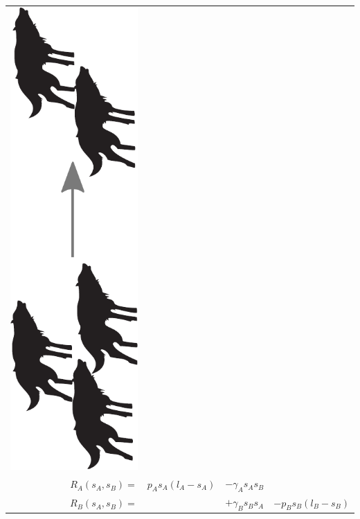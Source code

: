 \documentclass[12pt]{beamer}
\begin{document}
\begin{frame}
\begin{tabular}{ r c c c }
      \includegraphics[scale=0.12,angle=-90]{Bilder/lv_kill.pdf}
	  \\
	  \(
		R_A(s_A,s_B)=
	  \)
	  &
	  \(
		p_A s_A (l_A-s_A)
	  \)
	  &
	  \(
		- \gamma_A s_A s_B
	  \)
	  &
	  \\
	  \(
		R_B(s_A,s_B)=
	  \)
	  &
	  &
	  \(
		+ \gamma_B s_B s_A
	  \)
	  &
	  \(
		- p_B s_B (l_B-s_B)
	  \)
	  \\

\end{tabular}
\end{frame}
\end{document}
